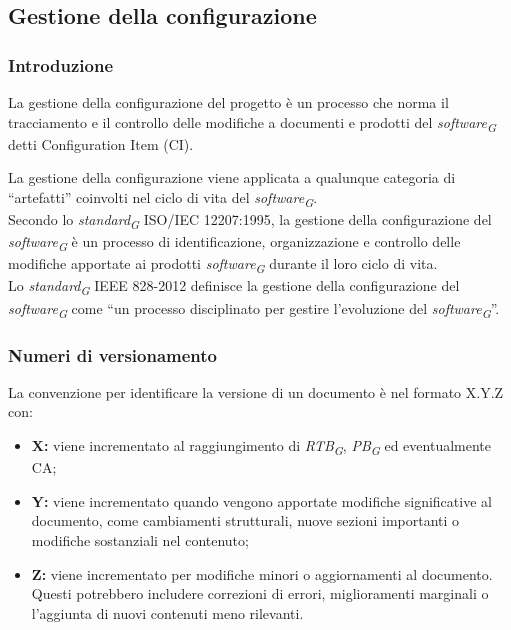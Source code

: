 \subsection{Gestione della configurazione}
\subsubsection{Introduzione}
La gestione della configurazione del progetto è un processo che norma il tracciamento e il controllo delle modifiche a documenti e prodotti del \textit{software}\textsubscript{\textit{G}} detti Configuration Item (CI).

La gestione della configurazione viene applicata a qualunque categoria di “artefatti” coinvolti nel ciclo di vita del \textit{software}\textsubscript{\textit{G}}. \\
Secondo lo \textit{standard}\textsubscript{\textit{G}} ISO/IEC 12207:1995, la gestione della configurazione del \textit{software}\textsubscript{\textit{G}} è un processo di identificazione, organizzazione e controllo delle modifiche apportate ai prodotti \textit{software}\textsubscript{\textit{G}} durante il loro ciclo di vita. \\
Lo \textit{standard}\textsubscript{\textit{G}} IEEE 828-2012 definisce la gestione della configurazione del \textit{software}\textsubscript{\textit{G}} come “un processo disciplinato per gestire l’evoluzione del \textit{software}\textsubscript{\textit{G}}”.

\subsubsection{Numeri di versionamento}\label{subsubsec:versionamento}
La convenzione per identificare la versione di un documento è nel formato X.Y.Z con:
\begin{itemize}
    \item \textbf{X:} viene incrementato al raggiungimento di \textit{RTB}\textsubscript{\textit{G}}, \textit{PB}\textsubscript{\textit{G}} ed eventualmente CA;
    \item \textbf{Y:} viene incrementato quando vengono apportate modifiche significative al documento, come cambiamenti strutturali, nuove sezioni importanti o modifiche sostanziali nel contenuto;
    \item \textbf{Z:} viene incrementato per modifiche minori o aggiornamenti al documento. Questi potrebbero includere correzioni di errori, miglioramenti marginali o l'aggiunta di nuovi contenuti meno rilevanti.
\end{itemize}

